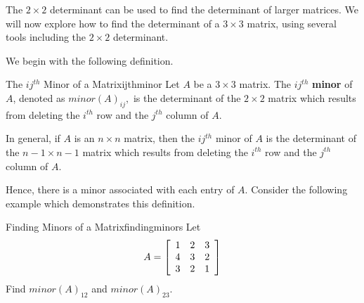 The $2 \times 2$ determinant can be used to find the determinant of larger matrices.
We will now explore how to find the determinant of a $3 \times 3$ matrix, using several tools
including the $2 \times 2$ determinant.

We begin with the following definition. 

\begin{definition}{The $ij^{th}$ Minor of a Matrix}{ijthminor}
Let $A$ be a $3\times 3$ matrix. The $ij^{th}$ \textbf{minor} of $A$, denoted as
 $minor\left( A\right) _{ij},$ is the determinant
of the $2\times 2$ matrix which results from deleting the $i^{th}$ row and
the $j^{th}$ column of $A$.

In general, if $A$ is an $n\times n$ matrix, then the $ij^{th}$ minor of $A$ is the determinant of the $n-1 \times n-1$ matrix which results from deleting the $i^{th}$ row and the $j^{th}$ column of $A$. 
\end{definition}

Hence, there is a minor associated with each entry of $A$. Consider the following example which demonstrates this definition. 

\begin{example}{Finding Minors of a Matrix}{findingminors}
Let 
\begin{equation*}
A = \left[
\begin{array}{rrr}
1 & 2 & 3 \\
4 & 3 & 2 \\
3 & 2 & 1
\end{array}
\right] 
\end{equation*}
Find $minor\left( A\right) _{12}$ and $minor\left( A\right) _{23}$.
\end{example}

